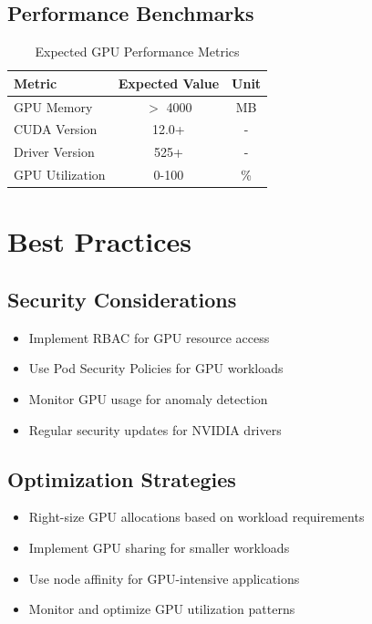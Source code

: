 \documentclass[12pt,a4paper]{report}
\begin{document}
\section{Performance Benchmarks}
\begin{table}[h]
    \centering
    \caption{Expected GPU Performance Metrics}
    \label{tab:performance-metrics}
    \begin{tabular}{@{}lcc@{}}
        \toprule
        \textbf{Metric} & \textbf{Expected Value} & \textbf{Unit} \\
        \midrule
        GPU Memory & $>$ 4000 & MB \\
        CUDA Version & 12.0+ & - \\
        Driver Version & 525+ & - \\
        GPU Utilization & 0-100 & \% \\
        \bottomrule
    \end{tabular}
\end{table}

\chapter{Best Practices}
\label{chap:best-practices}

\section{Security Considerations}
\begin{itemize}
    \item Implement RBAC for GPU resource access
    \item Use Pod Security Policies for GPU workloads
    \item Monitor GPU usage for anomaly detection
    \item Regular security updates for NVIDIA drivers
\end{itemize}

\section{Optimization Strategies}
\begin{itemize}
    \item Right-size GPU allocations based on workload requirements
    \item Implement GPU sharing for smaller workloads
    \item Use node affinity for GPU-intensive applications
    \item Monitor and optimize GPU utilization patterns
\end{itemize}
\end{document}
